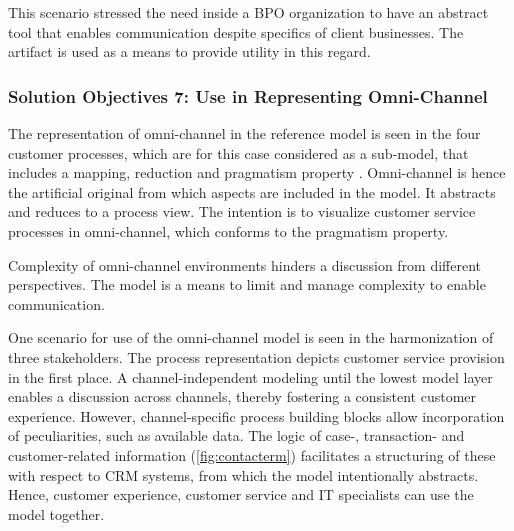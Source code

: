 This scenario stressed the need inside a BPO organization to have an abstract tool that enables communication despite specifics of client businesses. The artifact is used as a means to provide utility in this regard. 

\subsubsection{Solution Objectives 7: Use in Representing Omni-Channel}

The representation of omni-channel in the reference model is seen in the four customer processes, which are for this case considered as a sub-model, that includes a mapping, reduction and pragmatism property \citep{Stachowiak1973}. Omni-channel is hence the artificial original from which aspects are included in the model. It abstracts and reduces to a process view. The intention is to visualize customer service processes in omni-channel, which conforms to the pragmatism property.  

Complexity of omni-channel environments hinders a discussion from different perspectives. The model is a means to limit and manage complexity to enable communication.

One scenario for use of the omni-channel model is seen in the harmonization of three  stakeholders. The process representation depicts customer service provision in the first place. A channel-independent modeling until the lowest model layer enables a discussion across channels, thereby fostering a consistent customer experience. However, channel-specific process building blocks allow incorporation of peculiarities, such as available data. The logic of case-, transaction- and customer-related information (\cf \Fig \ref{fig:contacterm}) facilitates a structuring of these with respect to CRM systems, from which the model intentionally abstracts. Hence, customer experience, customer service and IT specialists can use the model together. 
